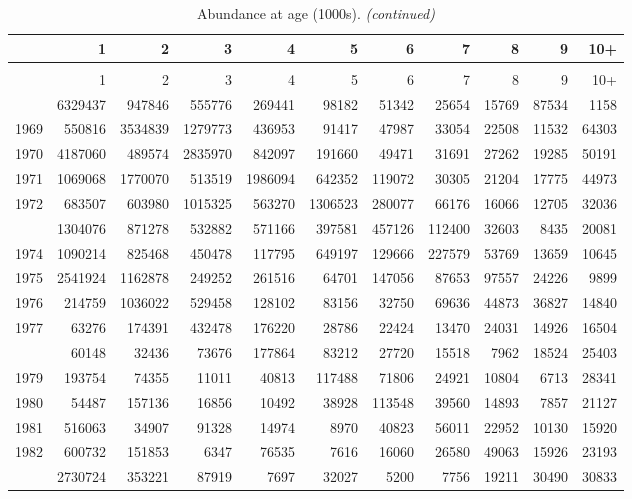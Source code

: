 \documentclass[
]{article}
\begin{document}
\begin{longtable}[t]{lrrrrrrrrrr}
\caption{\label{tab:NAA-table}Abundance at age (1000s).}\\
\toprule
  & 1 & 2 & 3 & 4 & 5 & 6 & 7 & 8 & 9 & 10+\\
\midrule
\endfirsthead
\caption[]{Abundance at age (1000s). \textit{(continued)}}\\
\toprule
  & 1 & 2 & 3 & 4 & 5 & 6 & 7 & 8 & 9 & 10+\\
\midrule
\endhead

\endfoot
\bottomrule
\endlastfoot
1968 & 6329437 & 947846 & 555776 & 269441 & 98182 & 51342 & 25654 & 15769 & 87534 & 1158\\
1969 & 550816 & 3534839 & 1279773 & 436953 & 91417 & 47987 & 33054 & 22508 & 11532 & 64303\\
1970 & 4187060 & 489574 & 2835970 & 842097 & 191660 & 49471 & 31691 & 27262 & 19285 & 50191\\
1971 & 1069068 & 1770070 & 513519 & 1986094 & 642352 & 119072 & 30305 & 21204 & 17775 & 44973\\
1972 & 683507 & 603980 & 1015325 & 563270 & 1306523 & 280077 & 66176 & 16066 & 12705 & 32036\\
\addlinespace
1973 & 1304076 & 871278 & 532882 & 571166 & 397581 & 457126 & 112400 & 32603 & 8435 & 20081\\
1974 & 1090214 & 825468 & 450478 & 117795 & 649197 & 129666 & 227579 & 53769 & 13659 & 10645\\
1975 & 2541924 & 1162878 & 249252 & 261516 & 64701 & 147056 & 87653 & 97557 & 24226 & 9899\\
1976 & 214759 & 1036022 & 529458 & 128102 & 83156 & 32750 & 69636 & 44873 & 36827 & 14840\\
1977 & 63276 & 174391 & 432478 & 176220 & 28786 & 22424 & 13470 & 24031 & 14926 & 16504\\
\addlinespace
1978 & 60148 & 32436 & 73676 & 177864 & 83212 & 27720 & 15518 & 7962 & 18524 & 25403\\
1979 & 193754 & 74355 & 11011 & 40813 & 117488 & 71806 & 24921 & 10804 & 6713 & 28341\\
1980 & 54487 & 157136 & 16856 & 10492 & 38928 & 113548 & 39560 & 14893 & 7857 & 21127\\
1981 & 516063 & 34907 & 91328 & 14974 & 8970 & 40823 & 56011 & 22952 & 10130 & 15920\\
1982 & 600732 & 151853 & 6347 & 76535 & 7616 & 16060 & 26580 & 49063 & 15926 & 23193\\
\addlinespace
1983 & 2730724 & 353221 & 87919 & 7697 & 32027 & 5200 & 7756 & 19211 & 30490 & 30833\\

\end{longtable}
\end{document}

